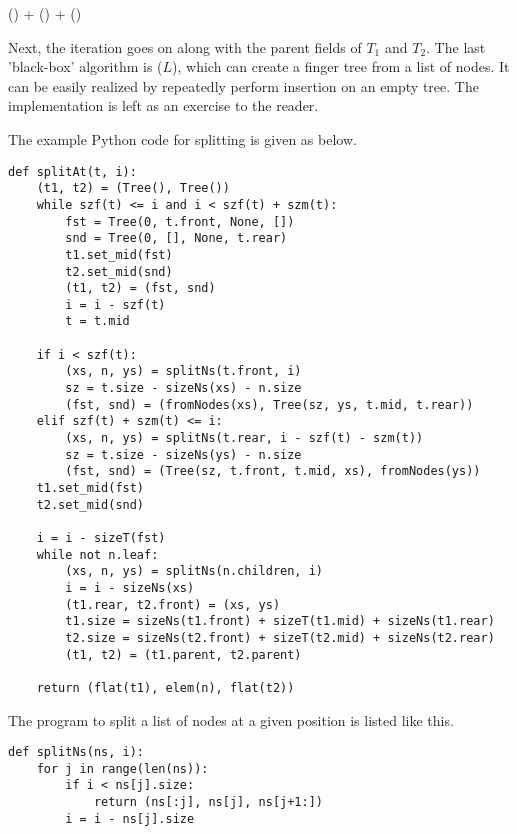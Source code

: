 \documentclass[UTF8]{article}
\begin{document}
\begin{algorithmic}
  \State \Return {}() + () + ()
\EndFunction
\end{algorithmic}

Next, the iteration goes on along with the parent fields of $T_1$ and $T_2$. The last 'black-box'
algorithm is ($L$), which can create a finger tree from a list of nodes.
It can be easily realized by repeatedly perform insertion on an empty tree. The implementation
is left as an exercise to the reader.

The example Python code for splitting is given as below.

\lstset{language=Python}
\begin{lstlisting}
def splitAt(t, i):
    (t1, t2) = (Tree(), Tree())
    while szf(t) <= i and i < szf(t) + szm(t):
        fst = Tree(0, t.front, None, [])
        snd = Tree(0, [], None, t.rear)
        t1.set_mid(fst)
        t2.set_mid(snd)
        (t1, t2) = (fst, snd)
        i = i - szf(t)
        t = t.mid

    if i < szf(t):
        (xs, n, ys) = splitNs(t.front, i)
        sz = t.size - sizeNs(xs) - n.size
        (fst, snd) = (fromNodes(xs), Tree(sz, ys, t.mid, t.rear))
    elif szf(t) + szm(t) <= i:
        (xs, n, ys) = splitNs(t.rear, i - szf(t) - szm(t))
        sz = t.size - sizeNs(ys) - n.size
        (fst, snd) = (Tree(sz, t.front, t.mid, xs), fromNodes(ys))
    t1.set_mid(fst)
    t2.set_mid(snd)

    i = i - sizeT(fst)
    while not n.leaf:
        (xs, n, ys) = splitNs(n.children, i)
        i = i - sizeNs(xs)
        (t1.rear, t2.front) = (xs, ys)
        t1.size = sizeNs(t1.front) + sizeT(t1.mid) + sizeNs(t1.rear)
        t2.size = sizeNs(t2.front) + sizeT(t2.mid) + sizeNs(t2.rear)
        (t1, t2) = (t1.parent, t2.parent)

    return (flat(t1), elem(n), flat(t2))
\end{lstlisting}

The program to split a list of nodes at a given position is listed like this.

\begin{lstlisting}
def splitNs(ns, i):
    for j in range(len(ns)):
        if i < ns[j].size:
            return (ns[:j], ns[j], ns[j+1:])
        i = i - ns[j].size
\end{lstlisting}
\end{document}
